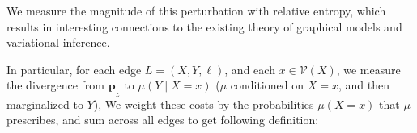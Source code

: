 \documentclass{article}
\theoremstyle{plain}
\theoremstyle{definition}
\theoremstyle{remark}
\newcommand\mat[1]{\mathbf{#1}}
\newcommand{\bp}[1][L]{\mat{p}_{\!_{#1}\!}}
\newcommand{\V}{\mathcal V}
\numberwithin{equation}{section}
\begin{document}
%
	We measure the magnitude of this perturbation with relative
        entropy, which results in interesting connections to 
	the existing theory of graphical models and variational inference.
		
		In particular, for each edge $L =
		       (X,Y, \ell)$, and each $x \in \V(X)$, we measure the
      		divergence from $\bp$ to $\mu(Y\mid X=x)$ ($\mu$
                conditioned 
		on $X=x$, and then marginalized to $Y$), 
	We weight these costs by the probabilities $\mu(X=x)$ that $\mu$ prescribes, and sum across all edges to get following definition:
        
\end{document}
